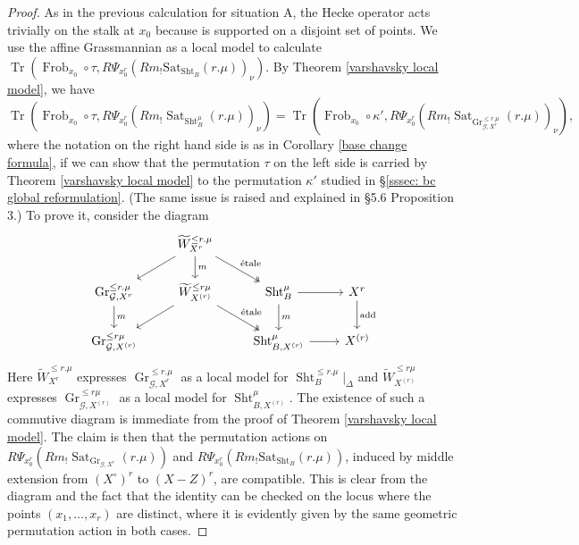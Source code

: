 \documentclass[reqno]{amsart}
\numberwithin{equation}{section}
\newcommand{\wt}[1]{\widetilde{#1}}
\newcommand{\Cal}[1]{\mathcal{#1}}
\newcommand{\mrm}[1]{\mathrm{#1}}
\newcommand{\cX}{X^{\circ}}
\DeclareMathOperator{\Frob}{Frob}
\DeclareMathOperator{\Tr}{Tr}
\DeclareMathOperator{\Gr}{Gr}
\DeclareMathOperator{\Sht}{Sht}
\DeclareMathOperator{\Sat}{Sat}
\theoremstyle{remark}
\numberwithin{equation}{section}
\begin{document}
\begin{proof}
As  in the previous calculation for situation A, the Hecke operator acts trivially on the stalk at $x_0$ because is supported on a disjoint set of points. We use the affine Grassmannian as a local model to calculate $ \Tr( \Frob_{x_0} \circ  \tau, R\Psi_{x_0^r}(Rm_! \mrm{Sat}_{\Sht_B}(r.\mu))_{\nu}) $. By Theorem \ref{varshavsky local model}, we have 
\begin{equation}\label{eq: B eq 2}
\Tr( \Frob_{x_0} \circ  \tau, R\Psi_{x_0^r}( Rm_! \Sat_{\Sht_B^{\mu}}(r.\mu))_{\nu}) = \Tr(\Frob_{x_0} \circ \kappa', R \Psi_{x_0^r} (Rm_! \Sat_{\Gr_{\Cal{G},X^r}^{\leq r.\mu}}(r.\mu))_{\nu}),
\end{equation}
where the notation on the right hand side is as in Corollary \ref{base change formula}, if we can show that the permutation $\tau$ on the left side is carried by Theorem \ref{varshavsky local model} to the permutation $\kappa'$ studied in \S \ref{sssec: bc global reformulation}. (The same issue is raised and explained in \cite{Ngo06} \S 5.6 Proposition 3.) To prove it, consider the diagram
\[
\begin{tikzcd} 
& \wt{W}^{\leq r.\mu}_{X^r} \ar[dr, twoheadrightarrow, "\text{\'{e}tale}"] \ar[dl]  \ar[d, "m"] \\
\Gr_{\Cal{G},X^r}^{\leq r.\mu} \ar[d, "m"] & \wt{W}^{\leq r\mu}_{X^{(r)}} \ar[dl] \ar[dr, twoheadrightarrow, "\text{\'{e}tale}"]  &  \Sht_B^{\mu} \ar[r] \ar[d,  "m"]	 & X^r  \ar[d, "\mrm{add}"] \\
\Gr_{\Cal{G},X^{(r)}}^{\leq r\mu} & & \Sht_{B, X^{(r)}}^{\mu} \ar[r]  & X^{(r)} 
\end{tikzcd}
\]
Here $\wt{W}^{\leq r.\mu}_{X^r} $ expresses $\Gr_{\Cal{G},X^r}^{\leq r.\mu}$ as a local model for $ \Sht_B^{\leq r.\mu}|_{\Delta}$ and $\wt{W}^{\leq r\mu}_{X^{(r)}}$ expresses $\Gr_{\Cal{G},X^{(r)}}^{\leq r\mu} $ as a local model for $ \Sht_{B, X^{(r)}}^{\mu} $. The existence of such a commutive diagram is immediate from the proof of Theorem \ref{varshavsky local model}. The claim is then that the permutation actions on $R\Psi_{x_0^r}(Rm_! \Sat_{\Gr_{\Cal{G},X^r}}(r.\mu))$ and $R\Psi_{x_0^r}(Rm_! \mrm{Sat}_{\Sht_B}(r.\mu))$, induced by middle extension from $(\cX)^r$ to $(X-Z)^r$, are compatible. This is clear from the diagram and the fact that the identity can be checked on the locus where the points $(x_1, \ldots, x_r)$ are distinct, where it is evidently given by the same geometric permutation action in both cases. 


\end{proof}
\end{document}
